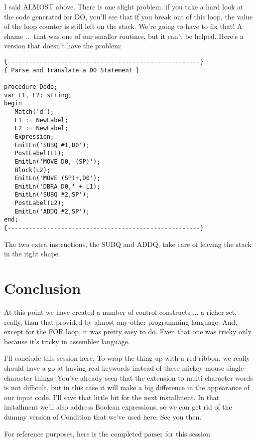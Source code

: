 I  said ALMOST above. There is one slight problem: if you take a hard  look  at  the code generated for DO, you'll see that if you break  out  of  this loop, the value of the loop counter is still left on the stack. We're going to have to fix that!  A shame ... that was one  of  our  smaller  routines, but it can't be helped. Here's a version that doesn't have the problem:

\begin{verbatim}
{------------------------------------------------------}
{ Parse and Translate a DO Statement }

procedure Dodo;
var L1, L2: string;
begin
   Match('d');
   L1 := NewLabel;
   L2 := NewLabel;
   Expression;
   EmitLn('SUBQ #1,D0');
   PostLabel(L1);
   EmitLn('MOVE D0,-(SP)');
   Block(L2);
   EmitLn('MOVE (SP)+,D0');
   EmitLn('DBRA D0,' + L1);
   EmitLn('SUBQ #2,SP');
   PostLabel(L2);
   EmitLn('ADDQ #2,SP');
end;
{------------------------------------------------------}
\end{verbatim}

The  two  extra  instructions, the  SUBQ and ADDQ, take care  of leaving the stack in the right shape.

\section{Conclusion}

At this point we have created a number of control  constructs ... a richer set, really, than that provided by almost any other programming language. And, except  for the FOR loop, it was pretty easy to do. Even that one was tricky only because it's tricky in assembler language.

I'll conclude this session here. To wrap the thing up with a red ribbon, we really  should  have  a  go  at  having  real keywords instead of these mickey-mouse  single-character  things. You've already seen that  the  extension to multi-character words is not difficult, but in this case it will make a big difference  in the appearance of our input code. I'll save that little bit  for the next installment. In that installment we'll also address Boolean expressions, so we can get rid of the dummy version  of Condition that we've used here. See you then.

For reference purposes, here is  the  completed  parser  for this session:


